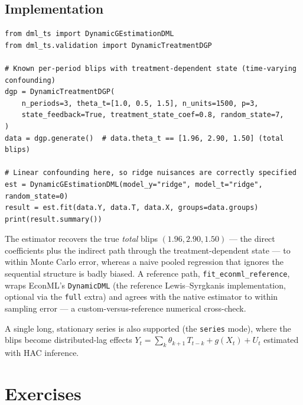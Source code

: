 \subsection{Implementation}

\begin{verbatim}
from dml_ts import DynamicGEstimationDML
from dml_ts.validation import DynamicTreatmentDGP

# Known per-period blips with treatment-dependent state (time-varying confounding)
dgp = DynamicTreatmentDGP(
    n_periods=3, theta_t=[1.0, 0.5, 1.5], n_units=1500, p=3,
    state_feedback=True, treatment_state_coef=0.8, random_state=7,
)
data = dgp.generate()  # data.theta_t == [1.96, 2.90, 1.50] (total blips)

# Linear confounding here, so ridge nuisances are correctly specified
est = DynamicGEstimationDML(model_y="ridge", model_t="ridge", random_state=0)
result = est.fit(data.Y, data.T, data.X, groups=data.groups)
print(result.summary())
\end{verbatim}

The estimator recovers the true \emph{total} blips $(1.96, 2.90, 1.50)$ --- the direct coefficients plus the indirect path through the treatment-dependent state --- to within Monte Carlo error, whereas a naive pooled regression that ignores the sequential structure is badly biased. A reference path, \texttt{fit\_econml\_reference}, wraps EconML's \texttt{DynamicDML} (the reference Lewis--Syrgkanis implementation, optional via the \texttt{full} extra) and agrees with the native estimator to within sampling error --- a custom-versus-reference numerical cross-check.


A single long, stationary series is also supported (the \texttt{series} mode), where the blips become distributed-lag effects $Y_t = \sum_k \theta_{k+1}\, T_{t-k} + g(X_t) + U_t$ estimated with HAC inference.

\section{Exercises}\label{sec:ch06_exercises}

